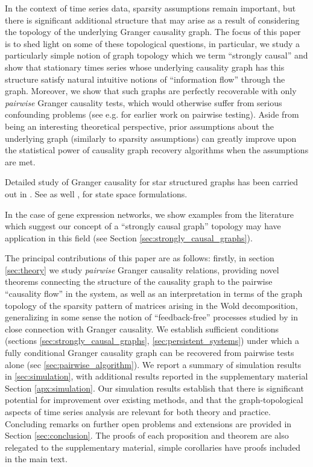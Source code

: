 \documentclass{statsoc}
\begin{document}
In the context of time series data, sparsity assumptions remain
important, but there is significant additional structure that may
arise as a result of considering the topology of the underlying
Granger causality graph.  The focus of this paper is to shed light on
some of these topological questions, in particular, we study a
particularly simple notion of graph topology which we term
``strongly causal'' and show that stationary times series whose
underlying causality graph has this structure satisfy natural
intuitive notions of ``information flow'' through the graph.
Moreover, we show that such graphs are perfectly recoverable with only
\textit{pairwise} Granger causality tests, which would otherwise
suffer from serious confounding problems (see
e.g. \cite{tam2013gene_pwgc} for earlier work on pairwise testing).
Aside from being an interesting theoretical perspective, prior
assumptions about the underlying graph (similarly to sparsity
assumptions) can greatly improve upon the statistical power of
causality graph recovery algorithms when the assumptions are met.

Detailed study of Granger causality for star structured graphs has
been carried out in \cite{jozsa2018relationship}.  See as well
\cite{barnett2015granger}, \cite{jozsa2018_phd_thesis} for state space
formulations.

In the case of gene expression networks, we show examples from the
literature which suggest our concept of a ``strongly causal graph''
topology may have application in this field (see Section
\ref{sec:strongly_causal_graphs}).

The principal contributions of this paper are as follows: firstly, in
section \ref{sec:theory} we study \textit{pairwise} Granger causality
relations, providing novel theorems connecting the structure of the
causality graph to the pairwise ``causality flow'' in the system, as
well as an interpretation in terms of the graph topology of the
sparsity pattern of matrices arising in the Wold decomposition,
generalizing in some sense the notion of ``feedback-free'' processes
studied by \cite{caines1975feedback} in close connection with
Granger causality.  We establish sufficient conditions (sections
\ref{sec:strongly_causal_graphs}, \ref{sec:persistent_systems}) under
which a fully conditional Granger causality graph can be recovered
from pairwise tests alone (sec \ref{sec:pairwise_algorithm}).  We
report a summary of simulation results in \ref{sec:simulation}, with
additional results reported in the supplementary material Section
\ref{apx:simulation}.  Our simulation results establish that there is
significant potential for improvement over existing methods, and that
the graph-topological aspects of time series analysis are relevant for
both theory and practice.  Concluding remarks on further open problems
and extensions are provided in Section \ref{sec:conclusion}.  The
proofs of each proposition and theorem are also relegated to the
supplementary material, simple corollaries have proofs included in the
main text.
\end{document}
